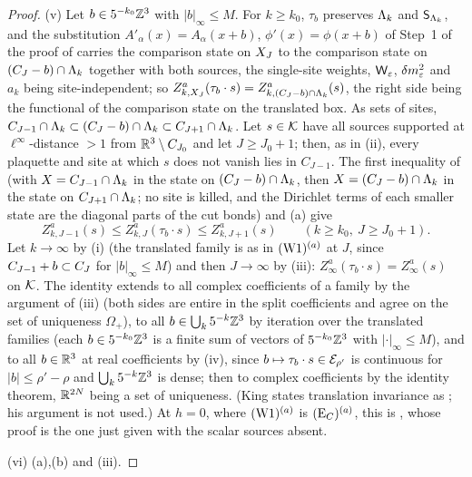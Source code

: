 \begin{proof}
(v) Let $b\in5^{-k_0}\mathbb Z^3$ with $|b|_\infty\le M$. For $k\ge k_0$, $\tau_b$ preserves $\Lambda_k$ and $\mathsf S_{\Lambda_k}$, and the substitution $A'_\alpha(x)=A_\alpha(x+b)$, $\phi'(x)=\phi(x+b)$ of Step~1 of the proof of  carries the comparison state on $X_J$ to the comparison state on $(C_J-b)\cap\Lambda_k$ together with both sources, the single-site weights, $\mathsf W_{\varepsilon}$, $\delta m^2_{\varepsilon}$ and $a_k$ being site-independent; so $Z^a_{k,X_J}(\tau_b\cdot s)=Z^a_{k,(C_J-b)\cap\Lambda_k}(s)$, the right side being the functional of the comparison state on the translated box. As sets of sites, $C_{J-1}\cap\Lambda_k\subset(C_J-b)\cap\Lambda_k\subset C_{J+1}\cap\Lambda_k$. Let $s\in\mathcal K$ have all sources supported at $\ell^\infty$-distance $>1$ from $\mathbb R^3\setminus C_{J_0}$ and let $J\ge J_0+1$; then, as in (ii), every plaquette and site at which $s$ does not vanish lies in $C_{J-1}$. The first inequality of  (with $X=C_{J-1}\cap\Lambda_k$ in the state on $(C_J-b)\cap\Lambda_k$, then $X=(C_J-b)\cap\Lambda_k$ in the state on $C_{J+1}\cap\Lambda_k$; no site is killed, and the Dirichlet terms of each smaller state are the diagonal parts of the cut bonds) and (a) give
\[
Z^a_{k,J-1}(s)\le Z^a_{k,J}(\tau_b\cdot s)\le Z^a_{k,J+1}(s)\qquad(k\ge k_0,\ J\ge J_0+1).
\]
Let $k\to\infty$ by (i) (the translated family is as in $(\mathrm{W1})^{(a)}$ at $J$, since $C_{J-1}+b\subset C_J$ for $|b|_\infty\le M$) and then $J\to\infty$ by (iii): $Z^a_\infty(\tau_b\cdot s)=Z^a_\infty(s)$ on $\mathcal K$. The identity extends to all complex coefficients of a family by the argument of (iii) (both sides are entire in the split coefficients and agree on the set of uniqueness $\Omega_+$), to all $b\in\bigcup_k5^{-k}\mathbb Z^3$ by iteration over the translated families (each $b\in5^{-k_0}\mathbb Z^3$ is a finite sum of vectors of $5^{-k_0}\mathbb Z^3$ with $|\cdot|_\infty\le M$), and to all $b\in\mathbb R^3$ at real coefficients by (iv), since $b\mapsto\tau_b\cdot s\in\mathcal E_{\rho'}$ is continuous for $|b|\le\rho'-\rho$ and $\bigcup_k5^{-k}\mathbb Z^3$ is dense; then to complex coefficients by the identity theorem, $\mathbb R^{2N}$ being a set of uniqueness. (King states translation invariance as \cite[Thm.~2.3(i)]{K2}; his argument is not used.) At $h=0$, where $(\mathrm{W1})^{(a)}$ is $(\mathrm{E}_{C})^{(a)}$, this is , whose proof is the one just given with the scalar sources absent.

(vi) (a),(b) and (iii).
\end{proof}

